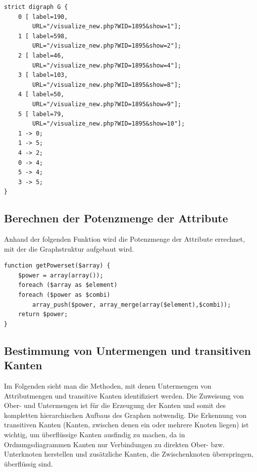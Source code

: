 \documentclass[pagesize,paper=A4,DIV=calc,fontsize=12pt,draft=false]{scrreprt}
\begin{document}
\lstset{
language=C
}

\begin{lstlisting}[caption={Dot-Syntax für Ordnungsdiagramm des Begriffsverbands für das Synset \emph{Macula}. Vereinfachte Darstellung.}]
strict digraph G {
	0 [ label=190, 
		URL="/visualize_new.php?WID=1895&show=1"];
	1 [ label=598, 
		URL="/visualize_new.php?WID=1895&show=2"];
	2 [ label=46, 
		URL="/visualize_new.php?WID=1895&show=4"];
	3 [ label=103, 
		URL="/visualize_new.php?WID=1895&show=8"];
	4 [ label=50, 
		URL="/visualize_new.php?WID=1895&show=9"];
	5 [ label=79, 
		URL="/visualize_new.php?WID=1895&show=10"];
	1 -> 0;
	1 -> 5;
	4 -> 2;
	0 -> 4;
	5 -> 4;
	3 -> 5;
}
\end{lstlisting}

\subsection{Berechnen der Potenzmenge der Attribute}

Anhand der folgenden Funktion wird die Potenzmenge der Attribute errechnet, mit der die Graphstruktur aufgebaut wird.

\lstset{
language=PHP
}

\begin{lstlisting}[caption={Potenzmenge der Attribute}]
function getPowerset($array) {
	$power = array(array());
	foreach ($array as $element)
	foreach ($power as $combi)
		array_push($power, array_merge(array($element),$combi));
	return $power;
}
\end{lstlisting}

\subsection{Bestimmung von Untermengen und transitiven Kanten}

Im Folgenden sieht man die Methoden, mit denen Untermengen von Attributmengen und transitive Kanten identifiziert werden. Die Zuweisung von Ober- und Untermengen ist für die Erzeugung der Kanten und somit des kompletten hierarchischen Aufbaus des Graphen notwendig. Die Erkennung von transitiven Kanten (Kanten, zwischen denen ein oder mehrere Knoten liegen) ist wichtig, um überflüssige Kanten ausfindig zu machen, da in Ordnungsdiagrammen Kanten nur Verbindungen zu direkten Ober- bzw. Unterknoten herstellen und zusätzliche Kanten, die Zwischenknoten überspringen, überflüssig sind.

\lstset{
language=PHP
}
\end{document}
